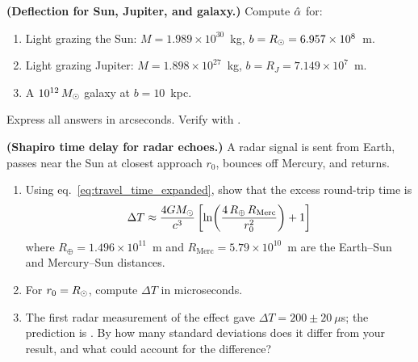 \begin{exercise}
\label{ex:deflections_numerical}
\textbf{(Deflection for Sun, Jupiter, and galaxy.)}
Compute $\hat{\alpha}$ for:
\begin{enumerate}[label=(\alph*)]
    \item Light grazing the Sun: $M = 1.989 \times 10^{30}$~kg,
          $b = R_{\odot} = 6.957 \times 10^{8}$~m.
    \item Light grazing Jupiter: $M = 1.898 \times 10^{27}$~kg,
          $b = R_J = 7.149 \times 10^{7}$~m.
    \item A $10^{12}\,M_{\odot}$ galaxy at $b = 10$~kpc.
\end{enumerate}
Express all answers in arcseconds.  Verify with
.
\end{exercise}

\begin{exercise}
\label{ex:shapiro_radar}
\textbf{(Shapiro time delay for radar echoes.)}
A radar signal is sent from Earth, passes near the Sun at closest approach
$r_0$, bounces off Mercury, and returns.
\begin{enumerate}[label=(\alph*)]
    \item Using eq.~\eqref{eq:travel_time_expanded}, show that the excess
          round-trip time is
          \begin{equation*}
              \Delta T \approx
              \frac{4G M_{\odot}}{c^3}
              \left[\ln\!\left(\frac{4\, R_\oplus\, R_{\mathrm{Merc}}}{r_0^2}
              \right) + 1\right]
          \end{equation*}
          where $R_\oplus = 1.496 \times 10^{11}$~m and
          $R_{\mathrm{Merc}} = 5.79 \times 10^{10}$~m are the
          Earth--Sun and Mercury--Sun distances.
    \item For $r_0 = R_{\odot}$, compute $\Delta T$ in microseconds.
    \item The first radar measurement of the effect \citep{shapiro_1968}
          gave $\Delta T = 200 \pm 20~\mu$s; the prediction is
          \citet{shapiro_1964}.  By how many
          standard deviations does it differ from your result, and what
          could account for the difference?
\end{enumerate}
\end{exercise}

